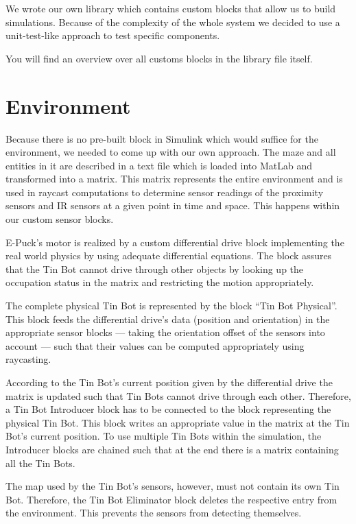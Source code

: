 \documentclass[a4paper,parskip,headheight=38pt]{scrartcl} %
\begin{document}
We wrote our own library which contains custom blocks that allow us to build simulations. Because of the complexity of the whole system we decided to use a unit-test-like approach to test specific components.

You will find an overview over all customs blocks in the library file itself.


\section{Environment}
Because there is no pre-built block in Simulink which would suffice for the environment, we needed to come up with our own approach. The maze and all entities in it are described in a text file which is loaded into MatLab and transformed into a matrix. This matrix represents the entire environment and is used in raycast computations to determine sensor readings of the proximity sensors and IR sensors at a given point in time and space. This happens within our custom sensor blocks.

E-Puck's motor is realized by a custom differential drive block implementing the real world physics by using adequate differential equations. The block assures that the Tin Bot cannot drive through other objects by looking up the occupation status in the matrix and restricting the motion appropriately.

The complete physical Tin Bot is represented by the block \enquote{Tin Bot Physical}. This block feeds the differential drive's data (position and orientation) in the appropriate sensor blocks — taking the orientation offset of the sensors into account — such that their values can be computed appropriately using raycasting.

According to the Tin Bot's current position given by the differential drive the matrix is updated such that Tin Bots cannot drive through each other. Therefore, a Tin Bot Introducer block has to be connected to the block representing the physical Tin Bot. This block writes an appropriate value in the matrix at the Tin Bot's current position. To use multiple Tin Bots within the simulation, the Introducer blocks are chained such that at the end there is a matrix containing all the Tin Bots.

The map used by the Tin Bot's sensors, however, must not contain its own Tin Bot. Therefore, the Tin Bot Eliminator block deletes the respective entry from the environment. This prevents the sensors from detecting themselves.
\end{document}
